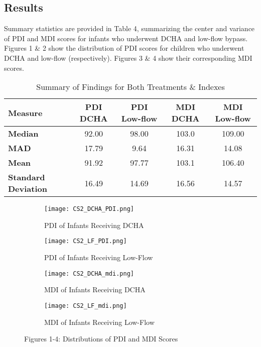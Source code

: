 \documentclass{article}
\begin{document}
\begin{enumerate}
		\subsection*{Results}
		Summary statistics are provided in Table 4, summarizing the center and variance of PDI and MDI scores for infants who underwent DCHA and low-flow bypass. Figures 1 \& 2 show the distribution of PDI scores for children who underwent DCHA and low-flow (respectively). Figures 3 \& 4 show their corresponding MDI scores.
		\begin{table}[h!]
			\centering
			\footnotesize
			\caption{Summary of Findings for Both Treatments \& Indexes}
			\label{tab:summary_statistics}
			\begin{tabular}{lcccc}
			\toprule
			\textbf{Measure}          & \textbf{PDI DCHA} & \textbf{PDI Low-flow} & \textbf{MDI DCHA} & \textbf{MDI Low-flow} \\ 
			\midrule
			\textbf{Median}           & 92.00             & 98.00                & 103.0             & 109.00              \\ 
			\textbf{MAD}              & 17.79             & 9.64                 & 16.31             & 14.08               \\ 
			\textbf{Mean}             & 91.92             & 97.77                & 103.1             & 106.40              \\ 
			\textbf{Standard Deviation} & 16.49            & 14.69                & 16.56             & 14.57               \\ 
			\bottomrule
			\end{tabular}
		\end{table}

		
		\begin{figure}[h!]
			\centering
			\begin{subfigure}[b]{0.23\textwidth}  %
				\centering
				\texttt{[image: CS2\_DCHA\_PDI.png]}
				\caption{PDI of Infants Receiving DCHA}
			\end{subfigure}
			\hfill
			\begin{subfigure}[b]{0.23\textwidth}  %
				\centering
				\texttt{[image: CS2\_LF\_PDI.png]}
				\caption{PDI of Infants Receiving Low-Flow}
			\end{subfigure}
			\hfill
			\begin{subfigure}[b]{0.23\textwidth}  %
				\centering
				\texttt{[image: CS2\_DCHA\_mdi.png]}
				\caption{MDI of Infants Receiving DCHA}
			\end{subfigure}
			\hfill
			\begin{subfigure}[b]{0.23\textwidth}  %
				\centering
				\texttt{[image: CS2\_LF\_mdi.png]}
				\caption{MDI of Infants Receiving Low-Flow}
			\end{subfigure}
			\caption{Figures 1-4: Distributions of PDI and MDI Scores}
			\label{fig:four_images}
		\end{figure}


\end{enumerate}
\end{document}
